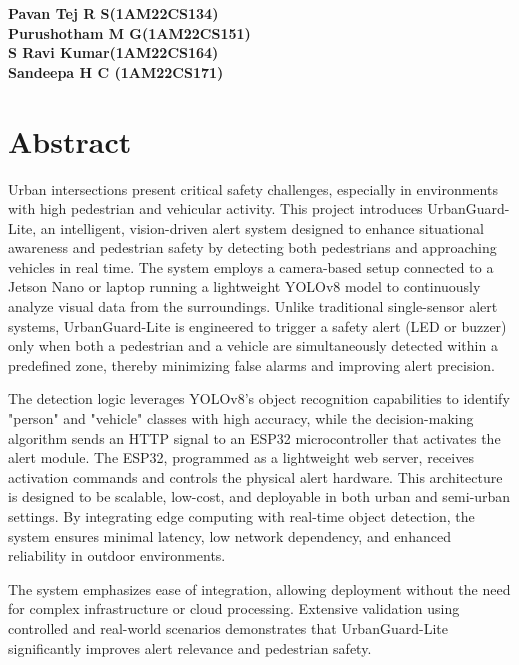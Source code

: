 \documentclass[a4paper, 12pt]{report}
\begin{document}
\vspace{0.2cm}

\begin{flushright}
    \textbf{Pavan Tej R S(1AM22CS134)}\\
    \textbf{Purushotham M G(1AM22CS151)}\\
    \textbf{S Ravi Kumar(1AM22CS164)}\\
    \textbf{Sandeepa H C (1AM22CS171)}\\
\end{flushright}


\chapter*{Abstract}
\thispagestyle{borderedpage}
{}
Urban intersections present critical safety challenges, especially in environments with high pedestrian and vehicular activity. This project introduces UrbanGuard-Lite, an intelligent, vision-driven alert system designed to enhance situational awareness and pedestrian safety by detecting both pedestrians and approaching vehicles in real time. The system employs a camera-based setup connected to a Jetson Nano or laptop running a lightweight YOLOv8 model to continuously analyze visual data from the surroundings. Unlike traditional single-sensor alert systems, UrbanGuard-Lite is engineered to trigger a safety alert (LED or buzzer) only when both a pedestrian and a vehicle are simultaneously detected within a predefined zone, thereby minimizing false alarms and improving alert precision.

The detection logic leverages YOLOv8's object recognition capabilities to identify "person" and "vehicle" classes with high accuracy, while the decision-making algorithm sends an HTTP signal to an ESP32 microcontroller that activates the alert module. The ESP32, programmed as a lightweight web server, receives activation commands and controls the physical alert hardware. This architecture is designed to be scalable, low-cost, and deployable in both urban and semi-urban settings. By integrating edge computing with real-time object detection, the system ensures minimal latency, low network dependency, and enhanced reliability in outdoor environments.

The system emphasizes ease of integration, allowing deployment without the need for complex infrastructure or cloud processing. Extensive validation using controlled and real-world scenarios demonstrates that UrbanGuard-Lite significantly improves alert relevance and pedestrian safety. 
\end{document}
